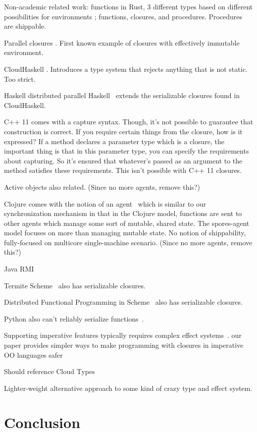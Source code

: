 \documentclass{llncs}
\begin{document}
Non-academic related work: functions in Rust, 3 different types based on
different possibilities for environments \cite{RustFunctions}; functions,
closures, and procedures. Procedures are shippable.

Parallel closures \cite{ParallelClosures}. First known example of closures
with effectively immutable environment.

CloudHaskell \cite{CloudHaskell}. Introduces a type system that rejects anything
that is not static. Too strict.

Haskell distributed parallel Haskell~\cite{HDPH} extends the serializable closures found in CloudHaskell.

C++ 11 comes with a capture syntax. Though, it's not possible to guarantee that construction is correct. If you require certain things from the closure, how is it expressed? If a method declares a parameter type which is a closure, the important thing is that in this parameter type, you can specify the requirements about capturing. So it's ensured that whatever's passed as an argument to the method satisfies these requirements. This isn't possible with C++ 11 closures. \cite{CplusplusLambas}

Active objects also related. \cite{ActiveObjects} (Since no more agents, remove this?)

Clojure comes with the notion of an agent~\cite{Clojure} which is similar to our synchronization mechanism in that in the Clojure model, functions are sent to other agents which manage some sort of mutable, shared state. The spores-agent model focuses on more than managing mutable state. No notion of shippability, fully-focused on multicore single-machine scenario. (Since no more agents, remove this?)

Java RMI~\cite{JavaRMI}

Termite Scheme~\cite{Termite} also has serializable closures.

Distributed Functional Programming in Scheme~\cite{DFPS} also has serializable closures.

Python also can't reliably serialize functions~\cite{PythonPickle}.

Supporting imperative features typically requires complex effect systems~\cite{DPJ}. our paper provides simpler ways to make programming with closures in imperative OO languages safer

Should reference Cloud Types~\cite{CloudTypes}

Lighter-weight alternative approach to some kind of crazy type and effect system.

\section{Conclusion}
\label{sec:conclusion}



\end{document}

